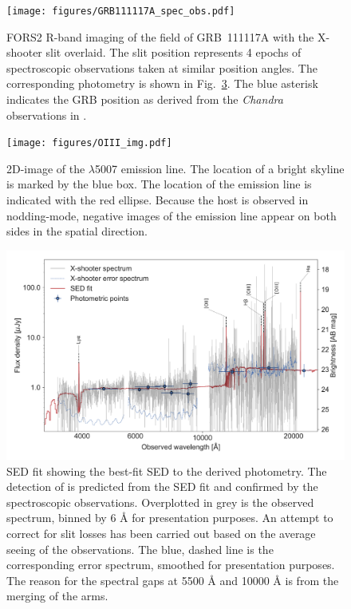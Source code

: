 \documentclass{aa}    %
\begin{document}
\begin{figure}
	\centering
	\texttt{[image: figures/GRB111117A\_spec\_obs.pdf]}
	\caption{
	FORS2 R-band imaging of the field of GRB~111117A with the X-shooter slit overlaid. The slit
	position represents 4 epochs of spectroscopic observations taken at similar
	position angles. The corresponding photometry
	is shown in Fig.~\ref{fig:SED}. The blue asterisk indicates the GRB position as
	derived from the \emph{Chandra} observations in \citet{Sakamoto2013}. 
	}
	\label{fig:spec_setup}
\end{figure}

\begin{figure}
	\centering
	\texttt{[image: figures/OIII\_img.pdf]}
	\caption{2D-image of the \oiii$\lambda$5007 emission line. The location of a bright skyline is marked by the blue box. The location of the emission line is indicated with the red ellipse. Because the host is observed in nodding-mode, negative images of the emission line appear on both sides in the spatial direction.}
	\label{fig:line}
\end{figure}


\begin{figure}
	\centering
	\includegraphics[width=16cm]{figures/SEDspecphot.pdf}
	\caption{SED fit showing the best-fit SED to the derived photometry. The detection of \lya{}  is predicted from the SED fit and confirmed by the spectroscopic observations. Overplotted in grey is the observed spectrum, binned by 6 \AA{} for presentation purposes. An attempt to correct for slit losses has been carried out based on the average seeing of the observations. The blue, dashed line is the corresponding error spectrum, smoothed for presentation purposes. The reason for the spectral gaps at 5500 \AA{} and 10000 \AA{} is from the merging of the arms.}
	\label{fig:SED}
\end{figure}
\end{document}
